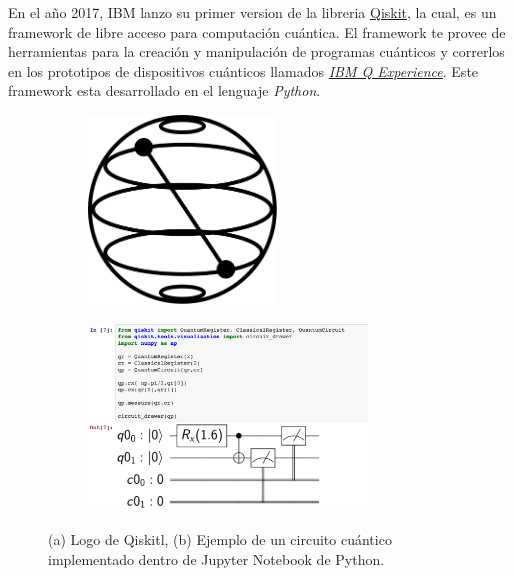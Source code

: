 En el año 2017, IBM lanzo su primer version de la libreria \href{https://qiskit.org/}{Qiskit}, la cual, es un framework de libre acceso para computación cuántica. El framework te provee de herramientas para la creación y manipulación de programas cuánticos
y correrlos en los prototipos de dispositivos cuánticos llamados \href{https://quantum-computing.ibm.com/}{\textit{IBM Q Experience}}. Este framework esta desarrollado en el lenguaje \textit{Python}. 
\begin{figure}[H]
    \begin{subfigure}{0.5\textwidth}
        \centering
        \caption{}
    \includegraphics[height=5cm]{images/Qiskit.png}
    \label{fig:logo_qiskit}
    \end{subfigure}
    \begin{subfigure}{0.5\textwidth}
        \centering
        \caption{}
    \includegraphics[height=5cm]{images/Example_qiskit.png}
    \label{fig:example_qiskit}
    \end{subfigure}
    \caption{(a) Logo de Qiskitl, (b) Ejemplo de un circuito cuántico implementado dentro de Jupyter Notebook de Python.}
\end{figure}